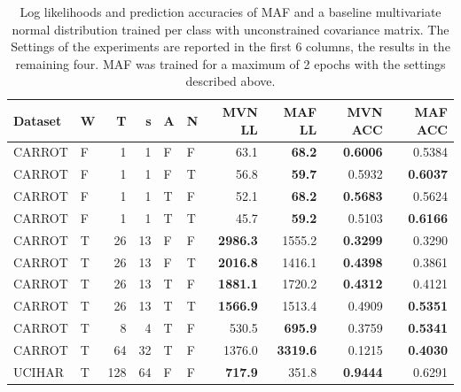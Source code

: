 \documentclass[11pt,titlepage,oneside,openany]{book}
\begin{document}
\begin{table}
	\centering
	\footnotesize
\begin{tabularx}{0.97\textwidth}{llrrllrrrr}
	\toprule
	Dataset &  W &  T &  s &  A &  N &    MVN LL &    MAF LL &  MVN ACC &  MAF ACC \\
	\midrule
	CARROT &   F &       1 &       1 &    F &  F &   63.1 &   \textbf{68.2} &   \textbf{0.6006} &   0.5384 \\
	CARROT &   F &       1 &       1 &    F &   T &   56.8 &   \textbf{59.7} &   0.5932 &   \textbf{0.6037} \\
	CARROT &   F &       1 &       1 &     T &  F &   52.1 &   \textbf{68.2} &  \textbf{0.5683} &   0.5624 \\
	CARROT &   F &       1 &       1 &     T &   T &   45.7 &   \textbf{59.2} &   0.5103 &   \textbf{0.6166} \\
	CARROT &   T &      26 &      13 &    F &  F & \textbf{2986.3} & 1555.2 &   \textbf{0.3299} &   0.3290 \\
	CARROT &   T &      26 &      13 &    F &   T & \textbf{2016.8} & 1416.1 &   \textbf{0.4398} &   0.3861 \\
	CARROT &   T &      26 &      13 &     T &  F & \textbf{1881.1} & 1720.2 &   \textbf{0.4312} &   0.4121 \\
	CARROT &   T &      26 &      13 &     T &   T & \textbf{1566.9} & 1513.4 &   0.4909 &   \textbf{0.5351} \\
	CARROT &   T &       8 &       4 &     T &  F &  530.5 & \textbf{695.9} &   0.3759 &   \textbf{0.5341} \\
	CARROT &   T &      64 &      32 &     T &  F & 1376.0 & \textbf{3319.6} &   0.1215 &   \textbf{0.4030} \\
	UCIHAR &   T &     128 &      64 &    F &  F &  \textbf{717.9} &  351.8 &   \textbf{0.9444} &   0.6291 \\
	\bottomrule
\end{tabularx}
\caption[Evaluation Results Carrot]{\label{tab:2eps} Log likelihoods and prediction accuracies of MAF and a baseline multivariate normal distribution trained per class with unconstrained covariance matrix. The Settings of the experiments are reported in the first 6 columns, the results in the remaining four. MAF was trained for a maximum of 2 epochs with the settings described above.}
\end{table}
\end{document}
